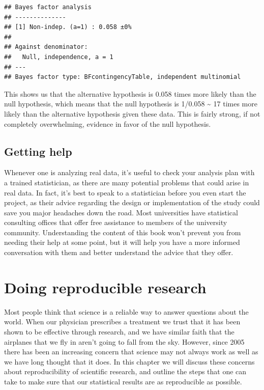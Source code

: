 \documentclass[12pt,]{book}
\theoremstyle{definition}
\theoremstyle{definition}
\theoremstyle{definition}
\theoremstyle{remark}
\begin{document}
\begin{verbatim}
## Bayes factor analysis
## --------------
## [1] Non-indep. (a=1) : 0.058 ±0%
## 
## Against denominator:
##   Null, independence, a = 1 
## ---
## Bayes factor type: BFcontingencyTable, independent multinomial
\end{verbatim}

This shows us that the alternative hypothesis is 0.058 times more likely than the null hypothesis, which means that the null hypothesis is 1/0.058 \textasciitilde{} 17 times more likely than the alternative hypothesis given these data. This is fairly strong, if not completely overwhelming, evidence in favor of the null hypothesis.

\hypertarget{getting-help}{%
\section{Getting help}\label{getting-help}}

Whenever one is analyzing real data, it's useful to check your analysis plan with a trained statistician, as there are many potential problems that could arise in real data. In fact, it's best to speak to a statistician before you even start the project, as their advice regarding the design or implementation of the study could save you major headaches down the road. Most universities have statistical consulting offices that offer free assistance to members of the university community. Understanding the content of this book won't prevent you from needing their help at some point, but it will help you have a more informed conversation with them and better understand the advice that they offer.

\hypertarget{doing-reproducible-research}{%
\chapter{Doing reproducible research}\label{doing-reproducible-research}}

Most people think that science is a reliable way to answer questions about the world. When our physician prescribes a treatment we trust that it has been shown to be effective through research, and we have similar faith that the airplanes that we fly in aren't going to fall from the sky. However, since 2005 there has been an increasing concern that science may not always work as well as we have long thought that it does. In this chapter we will discuss these concerns about reproducibility of scientific research, and outline the steps that one can take to make sure that our statistical results are as reproducible as possible.
\end{document}

